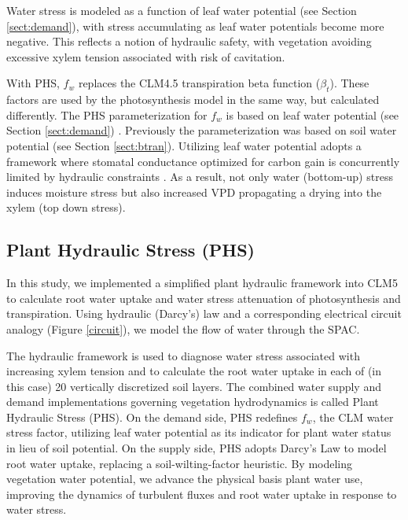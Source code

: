 \documentclass[draft,linenumbers]{agujournal}
\begin{document}
    Water stress is modeled as a function of leaf water potential (see Section \ref{sect:demand}), with stress accumulating as leaf water potentials become more negative.
    This reflects a notion of hydraulic safety, with vegetation avoiding excessive xylem tension associated with risk of cavitation.
    
    With PHS, $f_w$ replaces the CLM4.5 transpiration beta function ($\beta_t$). 
    These factors are used by the photosynthesis model in the same way, but calculated differently. 
    The PHS parameterization for $f_w$ is based on leaf water potential (see Section \ref{sect:demand}) . 
    Previously the parameterization was based on soil water potential (see Section \ref{sect:btran}).
    Utilizing leaf water potential adopts a framework where stomatal conductance optimized for carbon gain is concurrently limited by hydraulic constraints \citep{novick2016a}. As a result, not only water (bottom-up) stress induces moisture stress but also increased VPD propagating a drying into the xylem (top down stress).

    
\subsection{Plant Hydraulic Stress (PHS)}
  In this study, we implemented a simplified plant hydraulic framework into CLM5 to calculate root water uptake and water stress attenuation of photosynthesis and transpiration.
  Using hydraulic (Darcy's) law and a corresponding electrical circuit analogy (Figure \ref{circuit}), we model the flow of water through the SPAC. 
   
  The hydraulic framework is used to diagnose water stress associated with increasing xylem tension
  and to calculate the root water uptake in each of (in this case) 20 vertically discretized soil layers.
  The combined water supply and demand implementations governing vegetation hydrodynamics is called Plant Hydraulic Stress (PHS).
  On the demand side, PHS redefines $f_w$, the CLM water stress factor, utilizing leaf water potential as its indicator for plant water status in lieu of soil potential.
  On the supply side, PHS adopts Darcy's Law to model root water uptake, replacing a soil-wilting-factor heuristic.
  By modeling vegetation water potential, we advance the physical basis plant water use, 
  improving the dynamics of turbulent fluxes and root water uptake in response to water stress. 
\end{document}

